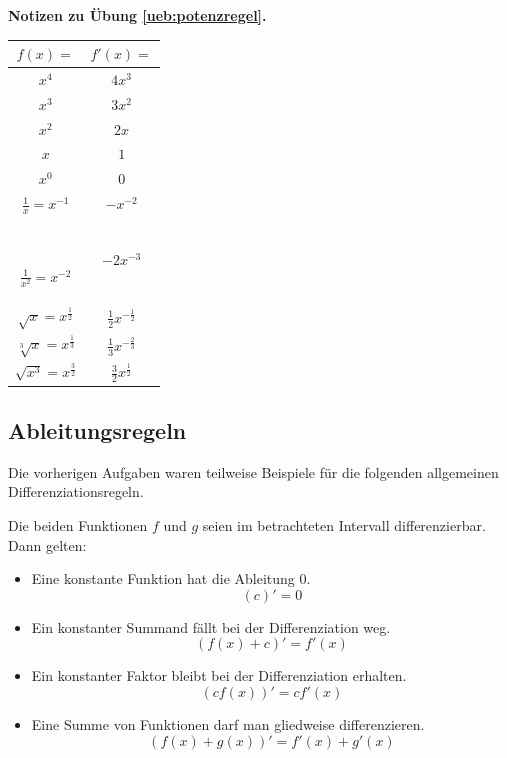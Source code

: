 \documentclass[%
11pt,%
twoside,%
titlepage,%
german,%
headsepline%
]{scrartcl}
\theoremstyle{definition}
\theoremstyle{plain}
\newcommand{\concatueb}[1]{ueb:#1}%
\newcommand{\concatlsg}[1]{lsg:#1}%
\newenvironment{lsg}[1]{%
    \par\noindent\textbf{Notizen zu Übung \ref{\concatueb{#1}}.}%
    \label{\concatlsg{#1}}
}{%
    \par%
}
\begin{document}
\begin{lsg}{potenzregel}
\def\mytabbottom{-2mm}
\def\mytabtop{6mm}
\begin{center}
\begin{tabular}{|c|c|}
\hline
\rule[\mytabbottom]{0pt}{\mytabtop}$f(x)=$ & $f'(x)=$\\ \hline
\rule[\mytabbottom]{0pt}{\mytabtop}$x^4$ & $4x^3$\\ \hline
\rule[\mytabbottom]{0pt}{\mytabtop}$x^3$ & $3x^2$\\ \hline
\rule[\mytabbottom]{0pt}{\mytabtop}$x^2$ & $2x$\\ \hline
\rule[\mytabbottom]{0pt}{\mytabtop}$x$ & $1$\\ \hline
\rule[\mytabbottom]{0pt}{\mytabtop}$x^0$ & $0$\\ \hline
\rule[\mytabbottom]{0pt}{\mytabtop}$\frac{1}{x}=x^{-1}$ & $-x^{-2}$\\ \hline\
\rule[\mytabbottom]{0pt}{\mytabtop}$\frac{1}{x^2}=x^{-2}$ & $-2x^{-3}$\\ \hline
\rule[\mytabbottom]{0pt}{\mytabtop}$\sqrt{x}=x^{\frac{1}{2}}$ & $\frac{1}{2}x^{-\frac{1}{2}}$\\ \hline
\rule[\mytabbottom]{0pt}{\mytabtop}$\sqrt[3]{x}=x^{\frac{1}{3}}$ & $\frac{1}{3}x^{-\frac{2}{3}}$\\ \hline
\rule[\mytabbottom]{0pt}{\mytabtop}$\sqrt{x^3}=x^{\frac{3}{2}}$ & $\frac{3}{2}x^\frac{1}{2}$\\ \hline
\end{tabular}
\end{center}
\end{lsg}

\clearpage

\subsection{Ableitungsregeln}

Die
vorherigen Aufgaben waren teilweise Beispiele f\"ur die folgenden allgemeinen Differenziations\-regeln.

Die beiden Funktionen $f$ und $g$ seien im betrachteten Intervall differenzierbar. Dann gelten:

\begin{itemize}
\item Eine konstante Funktion hat die Ableitung $0$.
$$(c)'=0$$
\item Ein konstanter Summand f\"allt bei der Differenziation weg.
$$(f(x)+c)'= f'(x)$$
\item Ein konstanter Faktor bleibt bei der Differenziation erhalten.
$$(cf(x))'=cf'(x)$$
\item Eine Summe von Funktionen darf man gliedweise differenzieren.
$$(f(x)+g(x))'=f'(x)+g'(x)$$
\end{itemize}
\end{document}
